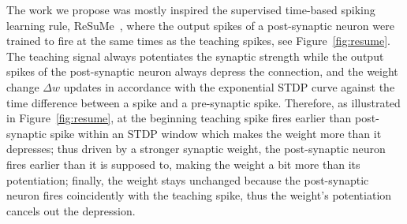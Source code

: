 The work we propose was mostly inspired \DIFdelbegin {}\DIFdelend \DIFaddbegin {}\DIFaddend the supervised time-based spiking learning rule, ReSuMe~\citep{ponulak2010supervised}, where the output spikes of a post-synaptic neuron were trained to fire at the same times as the teaching spikes, see Figure~\ref{fig:resume}.
The teaching signal always potentiates the synaptic strength while the output spikes of the post-synaptic neuron always depress the connection, and the weight change $\Delta w$ updates in accordance with the exponential STDP curve against the time difference between a \DIFaddbegin {}\DIFaddend spike and a pre-synaptic spike.
Therefore, as illustrated in Figure~\ref{fig:resume}, at the beginning \DIFdelbegin {}\DIFdelend \DIFaddbegin {}\DIFaddend teaching spike fires earlier than \DIFdelbegin {}\DIFdelend \DIFaddbegin {}\DIFaddend post-synaptic spike within an STDP window which makes the weight \DIFdelbegin {}\DIFdelend \DIFaddbegin {}\DIFaddend more than it depresses;
thus driven by a stronger synaptic weight, the post-synaptic neuron fires earlier than it is supposed to, making the weight \DIFdelbegin {}\DIFdelend \DIFaddbegin {}\DIFaddend a bit more than its potentiation;
finally, the weight stays unchanged because the post-synaptic neuron fires coincidently with the teaching spike, thus the weight's potentiation cancels out the depression.
